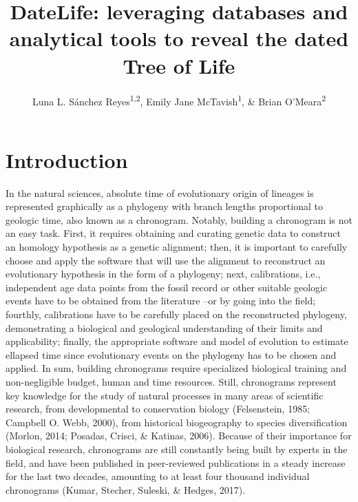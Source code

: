 \documentclass[
  english,
  man]{apa6}
\title{DateLife: leveraging databases and analytical tools to reveal the dated Tree of Life}
\author{Luna L. Sánchez Reyes\textsuperscript{1,2}, Emily Jane McTavish\textsuperscript{1}, \& Brian O'Meara\textsuperscript{2}}
\date{}
\affiliation{\vspace{0.5cm}\textsuperscript{1} University of California, Merced\\\textsuperscript{2} University of Tennessee, Knoxville}
\begin{document}
\maketitle

\hypertarget{introduction}{%
\section{Introduction}\label{introduction}}

In the natural sciences, absolute time of evolutionary origin of lineages is represented graphically as a phylogeny with branch lengths proportional to geologic time, also known as a chronogram.
Notably, building a chronogram is not an easy task.
First, it requires obtaining and curating genetic data to construct an homology hypothesis as a genetic alignment; then, it is important to carefully choose and apply the software that will use the alignment to reconstruct an evolutionary hypothesis in the form of a phylogeny; next, calibrations, i.e., independent age data points from the fossil record or other suitable geologic events have to be obtained from the literature --or by going into the field; fourthly, calibrations have to be carefully placed on the reconstructed phylogeny, demonstrating a biological and geological understanding of their limits and applicability; finally, the appropriate software and model of evolution to estimate ellapsed time since evolutionary events on the phylogeny has to be chosen and applied. In sum, building chronograms require specialized biological training and non-negligible budget, human and time resources.
Still, chronograms represent key knowledge for the study of natural processes in many areas of scientific research, from developmental to conservation biology (Felsenstein, 1985; Campbell O. Webb, 2000), from historical biogeography to species diversification (Morlon, 2014; Posadas, Crisci, \& Katinas, 2006).
Because of their importance for biological research, chronograms are still constantly being built by experts in the field, and have been published in peer-reviewed publications in a steady increase for the last two decades, amounting to at least four thousand individual chronograms (Kumar, Stecher, Suleski, \& Hedges, 2017).
\end{document}
